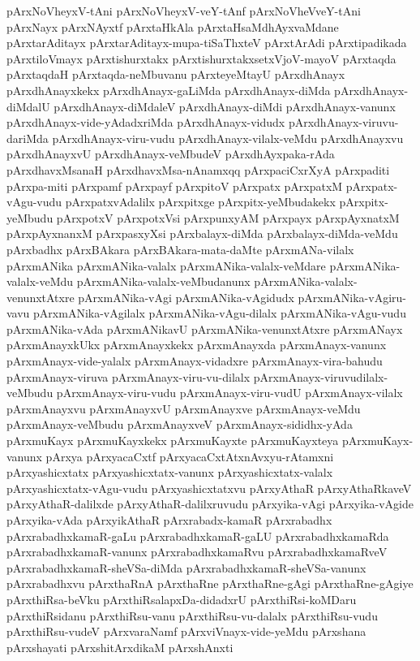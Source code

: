 {pArxNoVheyxV-tAni
pArxNoVheyxV-veY-tAnf
pArxNoVheVveY-tAni
pArxNayx
pArxNAyxtf
pArxtaHkAla
pArxtaHsaMdhAyxvaMdane
pArxtarAditayx
pArxtarAditayx-mupa-tiSaThxteV
pArxtArAdi
pArxtipadikada
pArxtiloVmayx
pArxtishurxtakx
pArxtishurxtakxsetxVjoV-mayoV
pArxtaqda
pArxtaqdaH
pArxtaqda-neMbuvanu
pArxteyeMtayU
pArxdhAnayx
pArxdhAnayxkekx
pArxdhAnayx-gaLiMda
pArxdhAnayx-diMda
pArxdhAnayx-diMdalU
pArxdhAnayx-diMdaleV
pArxdhAnayx-diMdi
pArxdhAnayx-vanunx
pArxdhAnayx-vide-yAdadxriMda
pArxdhAnayx-vidudx
pArxdhAnayx-viruvu-dariMda
pArxdhAnayx-viru-vudu
pArxdhAnayx-vilalx-veMdu
pArxdhAnayxvu
pArxdhAnayxvU
pArxdhAnayx-veMbudeV
pArxdhAyxpaka-rAda
pArxdhavxMsanaH
pArxdhavxMsa-nAnamxqq
pArxpaciCxrXyA
pArxpaditi
pArxpa-miti
pArxpamf
pArxpayf
pArxpitoV
pArxpatx
pArxpatxM
pArxpatx-vAgu-vudu
pArxpatxvAdalilx
pArxpitxge
pArxpitx-yeMbudakekx
pArxpitx-yeMbudu
pArxpotxV
pArxpotxVsi
pArxpunxyAM
pArxpayx
pArxpAyxnatxM
pArxpAyxnanxM
pArxpasxyXsi
pArxbalayx-diMda
pArxbalayx-diMda-veMdu
pArxbadhx
pArxBAkara
pArxBAkara-mata-daMte
pArxmANa-vilalx
pArxmANika
pArxmANika-valalx
pArxmANika-valalx-veMdare
pArxmANika-valalx-veMdu
pArxmANika-valalx-veMbudanunx
pArxmANika-valalx-venunxtAtxre
pArxmANika-vAgi
pArxmANika-vAgidudx
pArxmANika-vAgiru-vavu
pArxmANika-vAgilalx
pArxmANika-vAgu-dilalx
pArxmANika-vAgu-vudu
pArxmANika-vAda
pArxmANikavU
pArxmANika-venunxtAtxre
pArxmANayx
pArxmAnayxkUkx
pArxmAnayxkekx
pArxmAnayxda
pArxmAnayx-vanunx
pArxmAnayx-vide-yalalx
pArxmAnayx-vidadxre
pArxmAnayx-vira-bahudu
pArxmAnayx-viruva
pArxmAnayx-viru-vu-dilalx
pArxmAnayx-viruvudilalx-veMbudu
pArxmAnayx-viru-vudu
pArxmAnayx-viru-vudU
pArxmAnayx-vilalx
pArxmAnayxvu
pArxmAnayxvU
pArxmAnayxve
pArxmAnayx-veMdu
pArxmAnayx-veMbudu
pArxmAnayxveV
pArxmAnayx-sididhx-yAda
pArxmuKayx
pArxmuKayxkekx
pArxmuKayxte
pArxmuKayxteya
pArxmuKayx-vanunx
pArxya
pArxyacaCxtf
pArxyacaCxtAtxnAvxyu-rAtamxni
pArxyashicxtatx
pArxyashicxtatx-vanunx
pArxyashicxtatx-valalx
pArxyashicxtatx-vAgu-vudu
pArxyashicxtatxvu
pArxyAthaR
pArxyAthaRkaveV
pArxyAthaR-dalilxde
pArxyAthaR-dalilxruvudu
pArxyika-vAgi
pArxyika-vAgide
pArxyika-vAda
pArxyikAthaR
pArxrabadx-kamaR
pArxrabadhx
pArxrabadhxkamaR-gaLu
pArxrabadhxkamaR-gaLU
pArxrabadhxkamaRda
pArxrabadhxkamaR-vanunx
pArxrabadhxkamaRvu
pArxrabadhxkamaRveV
pArxrabadhxkamaR-sheVSa-diMda
pArxrabadhxkamaR-sheVSa-vanunx
pArxrabadhxvu
pArxthaRnA
pArxthaRne
pArxthaRne-gAgi
pArxthaRne-gAgiye
pArxthiRsa-beVku
pArxthiRsalapxDa-didadxrU
pArxthiRsi-koMDaru
pArxthiRsidanu
pArxthiRsu-vanu
pArxthiRsu-vu-dalalx
pArxthiRsu-vudu
pArxthiRsu-vudeV
pArxvaraNamf
pArxviVnayx-vide-yeMdu
pArxshana
pArxshayati
pArxshitArxdikaM
pArxshAnxti
}
